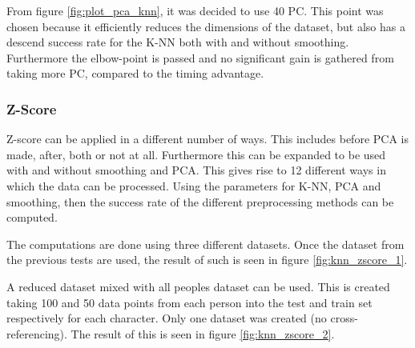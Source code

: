 


From figure \ref{fig:plot_pca_knn}, it was decided to use 40 PC.
This point was chosen because it efficiently reduces the dimensions of the dataset, but also has a descend success rate for the K-NN both with and without smoothing.
Furthermore the elbow-point is passed and no significant gain is gathered from taking more PC, compared to the timing advantage.



\subsubsection{Z-Score}
Z-score can be applied in a different number of ways.
This includes before PCA is made, after, both or not at all.
Furthermore this can be expanded to be used with and without smoothing and PCA.
This gives rise to 12 different ways in which the data can be processed.
Using the parameters for K-NN, PCA and smoothing, then the success rate of the different preprocessing methods can be computed.

The computations are done using three different datasets.
Once the dataset from the previous tests are used, the result of such is seen in figure \ref{fig:knn_zscore_1}.

A reduced dataset mixed with all peoples dataset can be used.
This is created taking 100 and 50 data points from each person into the test and train set respectively for each character.
Only one dataset was created (no cross-referencing).
The result of this is seen in figure \ref{fig:knn_zscore_2}.

